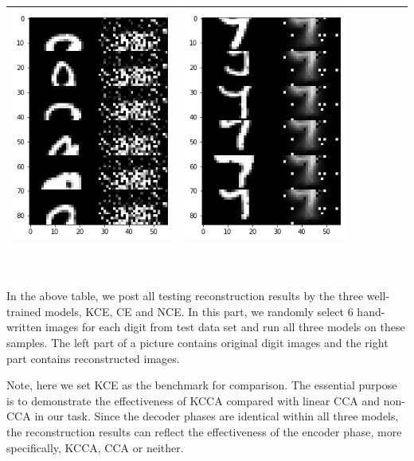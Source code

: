 \documentclass[12pt]{report} %
\begin{document}
\begin{tabular}{m{0.7cm}m{2.4cm}m{2.4cm}m{2.4cm}m{2.4cm}m{2.4cm}m{2.4cm}}
	\includegraphics[scale=0.3]{pictures/M2_9_up.png} & \includegraphics[scale=0.3]{pictures/M2_9_down.png}\\
	\bottomrule
\end{tabular}
\\
\\
In the above table, we post all testing reconstruction results by the three well-trained models, KCE, CE and NCE. In this part, we randomly select 6 hand-written images for each digit from test data set and run all three models on these samples. The left part of a picture contains original digit images and the right part contains reconstructed images. 

Note, here we set KCE as the benchmark for comparison. The essential purpose is to demonstrate the effectiveness of KCCA compared with linear CCA and non-CCA in our task. Since the decoder phases are identical within all three models, the reconstruction results can reflect the effectiveness of the encoder phase, more specifically, KCCA, CCA or neither. 
\end{document}
